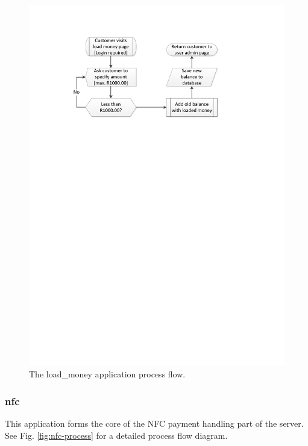 \begin{figure}
 \centering 
 \includegraphics[clip=true, trim = 0 580 100 70,
 scale=0.7]{load_money}
 \caption{The load\_money application process flow.}
 \label{fig:load-money}
\end{figure}

\subsubsection{nfc}
\label{sec:app-nfc}

This application forms the core of the NFC payment handling part of the server. See Fig.
\ref{fig:nfc-process} for a detailed process flow diagram.

